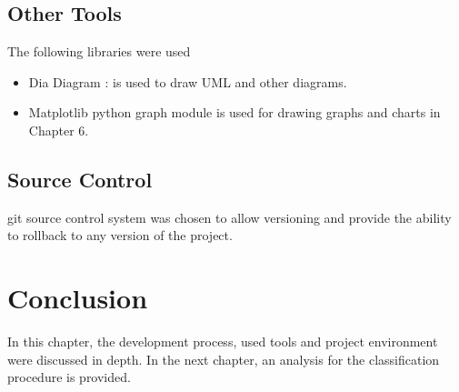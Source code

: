 \subsection{Other Tools}
The following libraries were used
\begin{itemize}
  \item Dia Diagram : is used to draw UML and other diagrams.
  \item Matplotlib python graph module is used for drawing graphs and charts in Chapter 6.
\end{itemize}

\subsection{Source Control}
git source control system \cite{GIT} was chosen to allow versioning and provide 
the ability to rollback to any version of the project.
\section{Conclusion}
\label{sec:conclusion_5}
In this chapter, the development process, used tools and project environment were 
discussed in depth. In the next chapter, an analysis for the classification 
procedure is provided.
